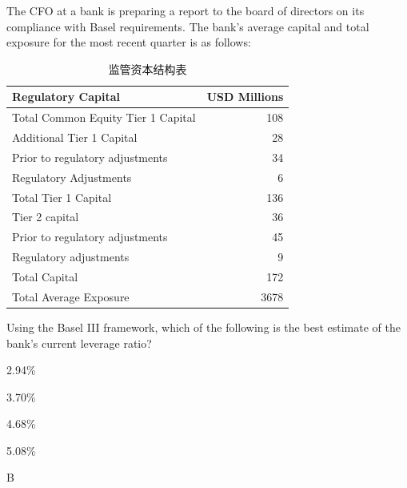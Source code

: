 \documentclass{article}
\newcounter{question} %
\begin{document}
\begin{question}
    The CFO at a bank is preparing a report to the board of directors on its compliance with Basel requirements. The bank's average capital and total exposure for the most recent quarter is as follows:

    \begin{table}[htbp]
        \centering
        \begin{tabular}{|l|r|}
            \hline
            \textbf{Regulatory Capital} & \textbf{USD Millions} \\
            \hline
            Total Common Equity Tier 1 Capital & 108 \\
            Additional Tier 1 Capital & 28 \\
            \quad Prior to regulatory adjustments & 34 \\
            \quad Regulatory Adjustments & 6 \\
            Total Tier 1 Capital & 136 \\
            Tier 2 capital & 36 \\
            \quad Prior to regulatory adjustments & 45 \\
            \quad Regulatory adjustments & 9 \\
            Total Capital & 172 \\
            Total Average Exposure & 3678 \\
            \hline
        \end{tabular}
        \caption{监管资本结构表}
    \end{table}

    Using the Basel III framework, which of the following is the best estimate of the bank's current leverage ratio?
\end{question}

\begin{choices}
    \item 2.94\%
    \item 3.70\%
    \item 4.68\%
    \item 5.08\%
\end{choices}

\begin{correctanswer}
    B
\end{correctanswer}
\end{document}
